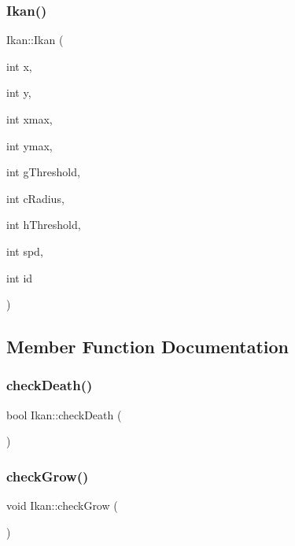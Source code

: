 \subsubsection{\texorpdfstring{Ikan()}{Ikan()}}
{\footnotesize\ttfamily Ikan\+::\+Ikan (\begin{DoxyParamCaption}\item[{int}]{x,  }\item[{int}]{y,  }\item[{int}]{xmax,  }\item[{int}]{ymax,  }\item[{int}]{g\+Threshold,  }\item[{int}]{c\+Radius,  }\item[{int}]{h\+Threshold,  }\item[{int}]{spd,  }\item[{int}]{id }\end{DoxyParamCaption})}



\subsection{Member Function Documentation}
\mbox{\label{class_ikan_a9a607ca1962b8f6029562e5571eaeb5c}} 
\subsubsection{\texorpdfstring{check\+Death()}{checkDeath()}}
{\footnotesize\ttfamily bool Ikan\+::check\+Death (\begin{DoxyParamCaption}{ }\end{DoxyParamCaption})}

\mbox{\label{class_ikan_a68425d0df0528611318bdbef89aaf039}} 
\subsubsection{\texorpdfstring{check\+Grow()}{checkGrow()}}
{\footnotesize\ttfamily void Ikan\+::check\+Grow (\begin{DoxyParamCaption}{ }\end{DoxyParamCaption})}

\mbox{\label{class_ikan_af92d7548a85251152d24c6906c504298}} 

